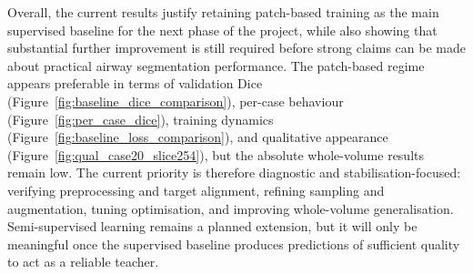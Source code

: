 \documentclass[11pt,a4paper]{article}
\begin{document}
Overall, the current results justify retaining patch-based training as the main supervised baseline for the next phase of the project, while also showing that substantial further improvement is still required before strong claims can be made about practical airway segmentation performance. The patch-based regime appears preferable in terms of validation Dice (Figure~\ref{fig:baseline_dice_comparison}), per-case behaviour (Figure~\ref{fig:per_case_dice}), training dynamics (Figure~\ref{fig:baseline_loss_comparison}), and qualitative appearance (Figure~\ref{fig:qual_case20_slice254}), but the absolute whole-volume results remain low. The current priority is therefore diagnostic and stabilisation-focused: verifying preprocessing and target alignment, refining sampling and augmentation, tuning optimisation, and improving whole-volume generalisation. Semi-supervised learning remains a planned extension, but it will only be meaningful once the supervised baseline produces predictions of sufficient quality to act as a reliable teacher.






\newpage
\end{document}
